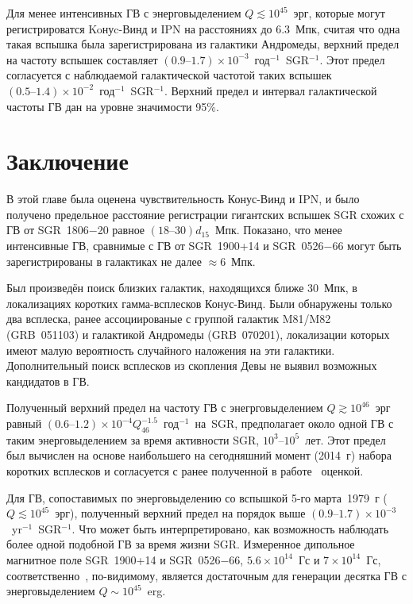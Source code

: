 Для менее интенсивных ГВ с энерговыделением $Q \lesssim 10^{45}$~эрг, которые 
могут регистрироватся Koнуc-Винд и IPN на расстояниях до 6.3~Мпк, считая что 
одна такая вспышка была зарегистрирована из галактики Андромеды, верхний предел 
на частоту вспышек составляет
${(0.9\textrm{--}1.7)\times 10^{-3}}$~год$^{-1}$~SGR$^{-1}$. Этот предел согласуется
с наблюдаемой галактической частотой таких вспышек 
${(0.5\textrm{--}1.4)\times 10^{-2}}$~год$^{-1}$~SGR$^{-1}$. Верхний предел и 
интервал галактической частоты ГВ дан на уровне значимости 95\%.

\section{Заключение}\label{Summary}
В этой главе была оценена чувствительность Конус-Винд и IPN, и было получено 
предельное расстояние регистрации гигантских вспышек SGR схожих с ГВ от SGR~1806$-$20 
равное $(18\textrm{--}30) d_{15}$~Мпк. Показано, что менее интенсивные ГВ, сравнимые 
с ГВ от SGR~1900+14 и SGR~0526$-$66 могут быть зарегистрированы в галактиках 
не далее $\approx 6$~Мпк.

Был произведён поиск близких галактик, находящихся ближе 30~Мпк, в локализациях 
коротких гамма-всплесков Конус-Винд. Были обнаружены только два всплеска, ранее 
ассоциированые с группой галактик M81/M82 (GRB~051103) и галактикой Андромеды (GRB~070201),
локализации которых имеют малую вероятность случайного наложения на эти галактики.
Дополнительный поиск всплесков из скопления Девы не выявил возможных кандидатов в ГВ.

Полученный верхний предел на частоту ГВ с энегрговыделением $Q \gtrsim 10^{46}$~эрг равный
${(0.6\textrm{--}1.2)\times 10^{-4} Q_{46}^{-1.5}}$~год$^{-1}$~на~SGR, предполагает 
около одной ГВ с таким энерговыделением за время активности SGR, $10^3\textrm{--}10^5$~лет. 
Этот предел был вычислен на основе наибольшего на сегодняшний момент (2014~г) 
набора коротких всплесков и согласуется с ранее полученной в работе~\citep{Ofek2007} оценкой.
 
Для ГВ, сопоставимых по энерговыделению со вспышкой 5-го марта~1979~г ($Q \lesssim 10^{45}$~эрг), 
полученный верхний предел на порядок выше $(0.9\textrm{--}1.7)\times 10^{-3}$~yr$^{-1}$~SGR$^{-1}$. 
Что может быть интерпретировано, как возможность наблюдать более одной подобной ГВ за время жизни SGR.
Измеренное дипольное магнитное поле SGR~1900+14 и SGR~0526$-$66, 
$5.6\times10^{14}$~Гс и $7\times10^{14}$~Гс, соответственно~\citep{Olausen_Kaspi2014}, 
по-видимому, является достаточным для генерации десятка ГВ с энерговыделением $Q \sim 10^{45}$~erg.

